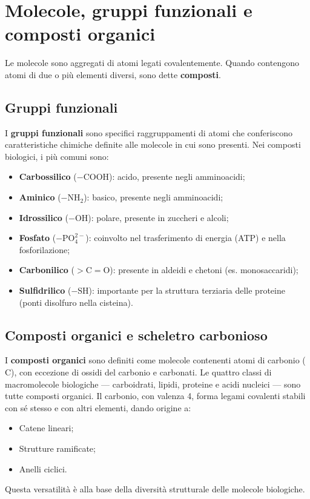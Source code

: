 \documentclass[12pt,a4paper]{report}
\begin{document}
\section{Molecole, gruppi funzionali e composti organici}
Le molecole sono aggregati di atomi legati covalentemente. Quando contengono atomi di due o più elementi diversi, sono dette \textbf{composti}.
\subsection{Gruppi funzionali}
I \textbf{gruppi funzionali} sono specifici raggruppamenti di atomi che conferiscono caratteristiche chimiche definite alle molecole in cui sono presenti. Nei composti biologici, i più comuni sono:
\begin{itemize}
\item \textbf{Carbossilico} (\(-\mathrm{COOH}\)): acido, presente negli amminoacidi;
\item \textbf{Aminico} (\(-\mathrm{NH_2}\)): basico, presente negli amminoacidi;
\item \textbf{Idrossilico} (\(-\mathrm{OH}\)): polare, presente in zuccheri e alcoli;
\item \textbf{Fosfato} (\(-\mathrm{PO_4^{2-}}\)): coinvolto nel trasferimento di energia (ATP) e nella fosforilazione;
\item \textbf{Carbonilico} (\(>\mathrm{C=O}\)): presente in aldeidi e chetoni (es. monosaccaridi);
\item \textbf{Sulfidrilico} (\(-\mathrm{SH}\)): importante per la struttura terziaria delle proteine (ponti disolfuro nella cisteina).
\end{itemize}
\subsection{Composti organici e scheletro carbonioso}
I \textbf{composti organici} sono definiti come molecole contenenti atomi di carbonio (\(\mathrm{C}\)), con eccezione di ossidi del carbonio e carbonati. Le quattro classi di macromolecole biologiche --- carboidrati, lipidi, proteine e acidi nucleici --- sono tutte composti organici.
Il carbonio, con valenza 4, forma legami covalenti stabili con sé stesso e con altri elementi, dando origine a:
\begin{itemize}
\item Catene lineari;
\item Strutture ramificate;
\item Anelli ciclici.
\end{itemize}
Questa versatilità è alla base della diversità strutturale delle molecole biologiche.
\end{document}
